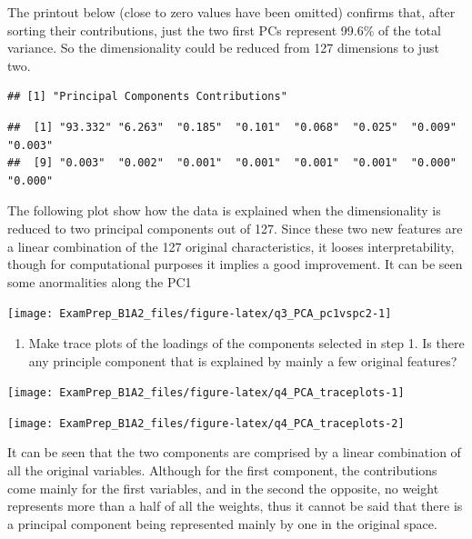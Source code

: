 \documentclass[
]{article}
\providecommand{\tightlist}{%
  \setlength{\itemsep}{0pt}\setlength{\parskip}{0pt}}
\begin{document}
The printout below (close to zero values have been omitted) confirms
that, after sorting their contributions, just the two first PCs
represent 99.6\% of the total variance. So the dimensionality could be
reduced from 127 dimensions to just two.

\begin{verbatim}
## [1] "Principal Components Contributions"
\end{verbatim}

\begin{verbatim}
##  [1] "93.332" "6.263"  "0.185"  "0.101"  "0.068"  "0.025"  "0.009"  "0.003" 
##  [9] "0.003"  "0.002"  "0.001"  "0.001"  "0.001"  "0.001"  "0.000"  "0.000"
\end{verbatim}

The following plot show how the data is explained when the
dimensionality is reduced to two principal components out of 127. Since
these two new features are a linear combination of the 127 original
characteristics, it looses interpretability, though for computational
purposes it implies a good improvement. It can be seen some anormalities
along the PC1

\begin{center}\texttt{[image: ExamPrep\_B1A2\_files/figure-latex/q3\_PCA\_pc1vspc2-1]} \end{center}

\begin{enumerate}
\def\labelenumi{\arabic{enumi}.}
\setcounter{enumi}{1}
\tightlist
\item
  Make trace plots of the loadings of the components selected in step 1.
  Is there any principle component that is explained by mainly a few
  original features?
\end{enumerate}

\begin{center}\texttt{[image: ExamPrep\_B1A2\_files/figure-latex/q4\_PCA\_traceplots-1]} \end{center}

\begin{center}\texttt{[image: ExamPrep\_B1A2\_files/figure-latex/q4\_PCA\_traceplots-2]} \end{center}

It can be seen that the two components are comprised by a linear
combination of all the original variables. Although for the first
component, the contributions come mainly for the first variables, and in
the second the opposite, no weight represents more than a half of all
the weights, thus it cannot be said that there is a principal component
being represented mainly by one in the original space.
\end{document}
